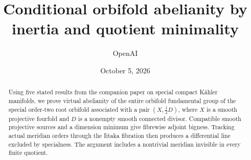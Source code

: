 

\title[Inertia and quotient minimality]{Conditional orbifold abelianity by inertia and quotient minimality}
\author{OpenAI}
\date{October 5, 2026}



\begin{abstract}
Using five stated results from the companion paper on special compact
K\"ahler manifolds, we prove virtual abelianity of the entire orbifold
fundamental group of the special order-two root orbifold associated with
a pair $(X,\tfrac12D)$, where $X$ is a smooth projective fourfold and $D$
is a nonempty smooth connected divisor. Compatible smooth projective
sources and a dimension minimum give fibrewise adjoint bigness.
Tracking actual meridian orders through the Iitaka fibration then
produces a differential line excluded by specialness. The argument
includes a nontrivial meridian invisible in every finite quotient.
\end{abstract}

\maketitle
\tableofcontents










